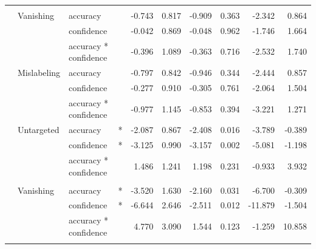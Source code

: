 \begin{longtable}[t]{llllrrrrrr}
\cmidrule{1-10}\pagebreak[0]
\addlinespace[0.3em]
\multicolumn{10}{l}{\textbf{SSD}}\\
\hspace{1em} & Vanishing & accuracy &  & -0.743 & 0.817 & -0.909 & 0.363 & -2.342 & 0.864\\
\cmidrule{3-10}\nopagebreak
\hspace{1em} &  & confidence &  & -0.042 & 0.869 & -0.048 & 0.962 & -1.746 & 1.664\\
\cmidrule{3-10}\nopagebreak
\hspace{1em} &  & accuracy * confidence &  & -0.396 & 1.089 & -0.363 & 0.716 & -2.532 & 1.740\\
\cmidrule{2-10}\nopagebreak
\hspace{1em} & Mislabeling & accuracy &  & -0.797 & 0.842 & -0.946 & 0.344 & -2.444 & 0.857\\
\cmidrule{3-10}\nopagebreak
\hspace{1em} &  & confidence &  & -0.277 & 0.910 & -0.305 & 0.761 & -2.064 & 1.504\\
\cmidrule{3-10}\nopagebreak
\hspace{1em} &  & accuracy * confidence &  & -0.977 & 1.145 & -0.853 & 0.394 & -3.221 & 1.271\\
\cmidrule{2-10}\nopagebreak
\hspace{1em} & Untargeted & accuracy & * & -2.087 & 0.867 & -2.408 & 0.016 & -3.789 & -0.389\\
\cmidrule{3-10}\nopagebreak
\hspace{1em} &  & confidence & * & -3.125 & 0.990 & -3.157 & 0.002 & -5.081 & -1.198\\
\cmidrule{3-10}\nopagebreak
\hspace{1em} &  & accuracy * confidence &  & 1.486 & 1.241 & 1.198 & 0.231 & -0.933 & 3.932\\
\cmidrule{1-10}\pagebreak[0]
\addlinespace[0.3em]
\multicolumn{10}{l}{\textbf{RetinaNet}}\\
\hspace{1em} & Vanishing & accuracy & * & -3.520 & 1.630 & -2.160 & 0.031 & -6.700 & -0.309\\
\cmidrule{3-10}\nopagebreak
\hspace{1em} &  & confidence & * & -6.644 & 2.646 & -2.511 & 0.012 & -11.879 & -1.504\\
\cmidrule{3-10}\nopagebreak
\hspace{1em} &  & accuracy * confidence &  & 4.770 & 3.090 & 1.544 & 0.123 & -1.259 & 10.858\\
\cmidrule{2-10}\nopagebreak

\end{longtable}
